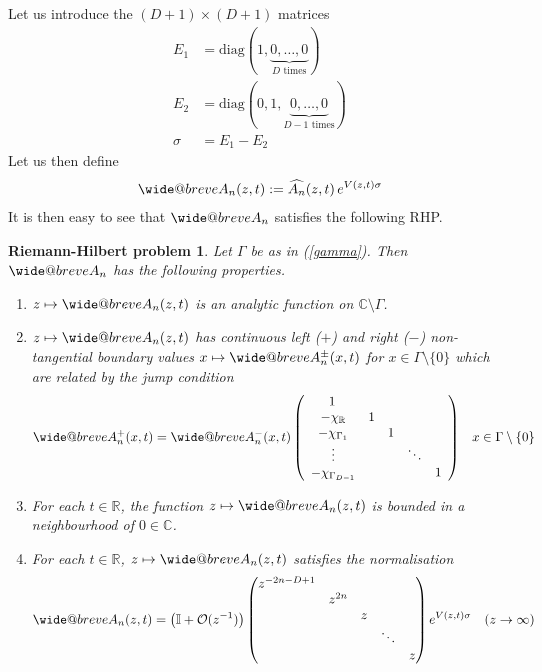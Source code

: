 \documentclass[12pt]{article}
\makeatletter
\def\widebreve{\mathpalette\wide@breve}
\def\wide@breve#1#2{\sbox\z@{$#1#2$}%
     \mathop{\vbox{\m@th\ialign{##\crcr
\kern0.08em\brevefill#1{0.8\wd\z@}\crcr\noalign{\nointerlineskip}%
                    $\hss#1#2\hss$\crcr}}}\limits}
\def\brevefill#1#2{$\m@th\sbox\tw@{$#1($}%
  \hss\resizebox{#2}{\wd\tw@}{\rotatebox[origin=c]{90}{\upshape(}}\hss$}
\newtheorem{rhp}[theorem]{Riemann-Hilbert problem}
\theoremstyle{definition}
\makeatother
\begin{document}
Let us introduce the $(D+1) \times (D+1)$ matrices
\begin{align*}
E_1 &= \mathrm{diag}(1,\underbrace{0, \dots, 0}_{D \text{ times}}) \\
E_2 &= \mathrm{diag}(0,1,\underbrace{0, \dots, 0}_{D-1 \text{ times}}) \\
\sigma &= E_1 - E_2
\end{align*}
Let us then define
\begin{align}
\widebreve{A}_{n}(z,t) := \widehat{A_{n}}(z,t) \, e^{ V(z,t) \sigma} 
\end{align}
It is then easy to see that $\widebreve{A}_{n}$ satisfies the following RHP.
\begin{rhp} Let $\Gamma$ be as in (\ref{gamma}). Then $\widebreve{A}_{n}$ has the following properties.

\begin{enumerate}
\item $z\mapsto \widebreve{A}_{n}(z,t)$ is an analytic function on $\mathbb{C}\setminus \Gamma$.
\item $z\mapsto \widebreve{A}_{n}(z,t)$ has continuous left ($+$) and right ($-$) non-tangential boundary values $ x \mapsto \widebreve{A}_{n}^{\pm}(x,t)$ for $x \in \Gamma \setminus \{ 0 \}$ which are related by the jump condition
\begin{align*}
\widebreve{A}_{n}^{+}(x,t) = \widebreve{A}_{n}^{-}(x,t) \left(
\begin{array}{ccccccccccccccccccc}
1 \,  & \,   \,  & \,   \,   & \,   \,  & \,     \\
-\chi_\mathbb{R} & 1 \\
-\chi_{\Gamma_1} & & 1 \\
\vdots & & & \ddots \\
-\chi_{\Gamma_{D-1}} & & & & 1 \\
\end{array} \right) & & x \in \Gamma \setminus \{ 0 \}
\end{align*}
\item For each $t \in \mathbb{R}$, the function $z \mapsto \widebreve{A}_{n}(z,t)$ is bounded in a neighbourhood of $0 \in \mathbb{C}$.
\item For each $t \in \mathbb{R}$, $z \mapsto \widebreve{A}_{n}(z,t)$ satisfies the normalisation
\begin{align*}
\widebreve{A}_{n}(z,t) = \left(\mathbb{I}+ \mathcal{O}(z^{-1})\right) \left(\begin{matrix}
z^{-2n-D+1} \\
& z^{2n} \\
& & z \\
& & & \ddots  \\
& & & & z
\end{matrix} \right) e^{V(z,t) \sigma}  & &  (z \to \infty)
\end{align*}
\end{enumerate}
\end{rhp}
\end{document}
